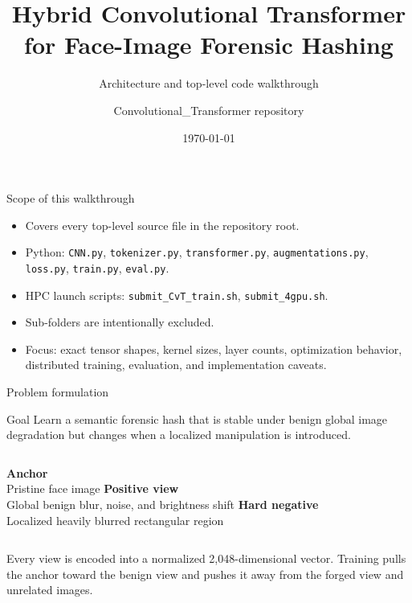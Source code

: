 \documentclass[aspectratio=169,10pt]{beamer}
\title{Hybrid Convolutional Transformer\\for Face-Image Forensic Hashing}
\subtitle{Architecture and top-level code walkthrough}
\author{Convolutional\_Transformer repository}
\date{\today}
\newcommand{\file}[1]{\texttt{#1}}
\begin{document}
\begin{frame}
  \titlepage
\end{frame}

\begin{frame}{Scope of this walkthrough}
  \begin{itemize}
    \item Covers every top-level source file in the repository root.
    \item Python: \file{CNN.py}, \file{tokenizer.py}, \file{transformer.py},
          \file{augmentations.py}, \file{loss.py}, \file{train.py}, \file{eval.py}.
    \item HPC launch scripts: \file{submit\_CvT\_train.sh}, \file{submit\_4gpu.sh}.
    \item Sub-folders are intentionally excluded.
    \item Focus: exact tensor shapes, kernel sizes, layer counts, optimization
          behavior, distributed training, evaluation, and implementation caveats.
  \end{itemize}
\end{frame}

\begin{frame}{Problem formulation}
  \begin{block}{Goal}
    Learn a semantic forensic hash that is stable under benign global image
    degradation but changes when a localized manipulation is introduced.
  \end{block}
  \begin{columns}[T]
      \textbf{Anchor}\\
      Pristine face image
      \textbf{Positive view}\\
      Global benign blur, noise, and brightness shift
      \textbf{Hard negative}\\
      Localized heavily blurred rectangular region
  \end{columns}
  \vspace{0.7em}
  Every view is encoded into a normalized 2,048-dimensional vector. Training
  pulls the anchor toward the benign view and pushes it away from the forged view
  and unrelated images.
\end{frame}
\end{document}
